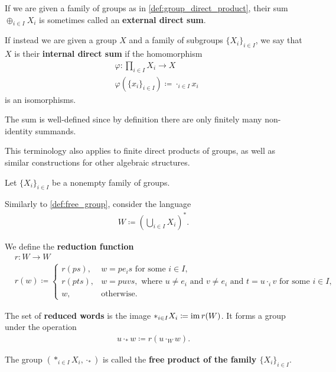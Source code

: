 \begin{note}\label{def:group_direct_sum_external_internal}\cite[126]{Knapp2016BAlg}
  If we are given a family of groups as in \cref{def:group_direct_product}, their sum \( \oplus_{i \in I} X_i \) is sometimes called an \textbf{external direct sum}.

  If instead we are given a group \( X \) and a family of subgroups \( \{ X_i \}_{i \in I} \), we say that \( X \) is their \textbf{internal direct sum} if the homomorphism
  \begin{align*}
    &\varphi: \prod_{i \in I} X_i \to X \\
    &\varphi(\{ x_i \}_{i \in I}) \coloneqq \cdot_{i \in I} x_i
  \end{align*}
  is an isomorphisms.

  The sum is well-defined since by definition there are only finitely many non-identity summands.

  This terminology also applies to finite direct products of groups, as well as similar constructions for other algebraic structures.
\end{note}

\begin{definition}\label{def:group_free_product}\cite[323]{Knapp2016BAlg}
  Let \( \{ X_i \}_{i \in I} \) be a nonempty family of groups.

  Similarly to \cref{def:free_group}, consider the language
  \begin{align*}
    W \coloneqq \left( \bigcup_{i \in I} X_i \right)^{*}.
  \end{align*}

  We define the \textbf{reduction function}
  \begin{align*}
    &r: W \to W \\
    &r(w) \coloneqq \begin{cases}
      r(ps), &w = p e_i s \text{ for some } i \in I, \\
      r(pts), &w = puvs, \text{ where } u \neq e_i \text{ and } v \neq e_i \text{ and } t = u \cdot_i v \text{ for some } i \in I, \\
      w, &\text{otherwise}.
    \end{cases}
  \end{align*}

  The set of \textbf{reduced words} is the image \( \ast_{i \in I} X_i \coloneqq \operatorname{im} r(W) \). It forms a group under the operation
  \begin{align*}
    u \cdot_\ast w \coloneqq r(u \cdot_{W} w).
  \end{align*}

  The group \( (\ast_{i \in I} X_i, \cdot_\ast) \) is called the \textbf{free product of the family \( \{ X_i \}_{i \in I} \)}.
\end{definition}

